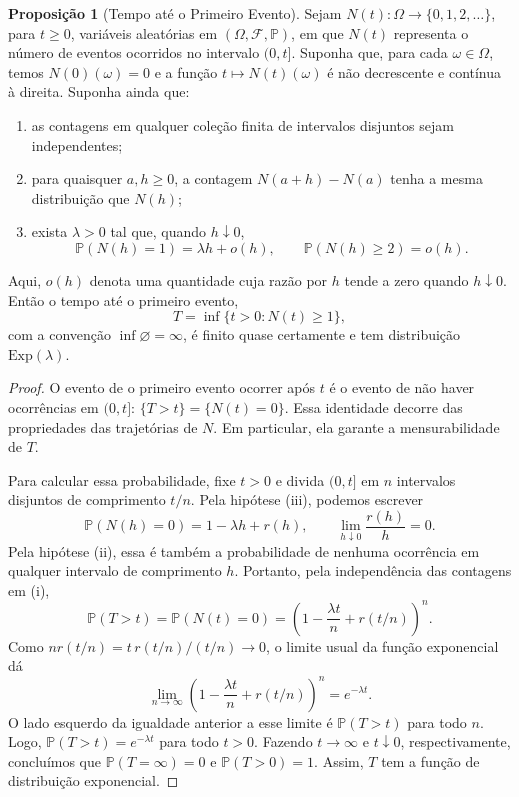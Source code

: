 \documentclass[12pt,portuguese]{article}
\theoremstyle{definition}
\newtheorem{proposition}[proposition]{Proposição}
\theoremstyle{plainexercise}
\theoremstyle{starredexercise}
\theoremstyle{definition}
\begin{document}
\begin{proposition}[Tempo até o Primeiro Evento]\label{prop:tempo-primeiro-evento}
Sejam $N(t):\Omega\to\{0,1,2,\ldots\}$, para $t\geqslant0$, variáveis
aleatórias em $(\Omega,\mathcal{F},\mathbb{P})$, em que $N(t)$ representa
o número de eventos ocorridos no intervalo $(0,t]$. Suponha que, para
cada $\omega\in\Omega$, temos $N(0)(\omega)=0$ e a função
$t\mapsto N(t)(\omega)$ é não decrescente e contínua à direita.
Suponha ainda que:
\begin{enumerate}[label=\textnormal{(\roman*)}]
  \item as contagens em qualquer coleção finita de intervalos disjuntos
  sejam independentes;
  \item para quaisquer $a,h\geqslant0$, a contagem $N(a+h)-N(a)$ tenha
  a mesma distribuição que $N(h)$;
  \item exista $\lambda>0$ tal que, quando $h\downarrow0$,
  \[
    \mathbb{P}(N(h)=1)=\lambda h+o(h),
    \qquad \mathbb{P}(N(h)\geqslant2)=o(h).
  \]
\end{enumerate}
Aqui, $o(h)$ denota uma quantidade cuja razão por $h$ tende a zero
quando $h\downarrow0$. Então o tempo até o primeiro evento,
\[
  T=\inf\{t>0:N(t)\geqslant1\},
\]
com a convenção $\inf\varnothing=\infty$, é finito quase certamente e
tem distribuição $\mathrm{Exp}(\lambda)$.
\end{proposition}
\begin{proof}
O evento de o primeiro evento ocorrer após $t$ é o evento de não haver
ocorrências em $(0,t]$: $\{T>t\}=\{N(t)=0\}$.
Essa identidade decorre das propriedades das trajetórias de $N$.
Em particular, ela garante a mensurabilidade de $T$.

Para calcular essa probabilidade, fixe $t>0$ e divida $(0,t]$ em $n$
intervalos disjuntos de comprimento $t/n$. Pela hipótese (iii),
podemos escrever
\[
  \mathbb{P}(N(h)=0)=1-\lambda h+r(h),
  \qquad \lim_{h\downarrow0}\frac{r(h)}{h}=0.
\]
Pela hipótese (ii), essa é também a probabilidade de nenhuma ocorrência
em qualquer intervalo de comprimento $h$. Portanto, pela independência
das contagens em (i),
\[
  \mathbb{P}(T>t)
  =\mathbb{P}(N(t)=0)
  =\left(1-\frac{\lambda t}{n}+r(t/n)\right)^n.
\]
Como $nr(t/n)=t\,r(t/n)/(t/n)\to0$, o limite usual da função
exponencial dá
\[
  \lim_{n\to\infty}
  \left(1-\frac{\lambda t}{n}+r(t/n)\right)^n=e^{-\lambda t}.
\]
O lado esquerdo da igualdade anterior a esse limite é
$\mathbb{P}(T>t)$ para todo $n$. Logo,
$\mathbb{P}(T>t)=e^{-\lambda t}$ para todo $t>0$.
Fazendo $t\to\infty$ e $t\downarrow0$, respectivamente, concluímos
que $\mathbb{P}(T=\infty)=0$ e $\mathbb{P}(T>0)=1$.
Assim, $T$ tem a função de distribuição exponencial.
\end{proof}
\end{document}

